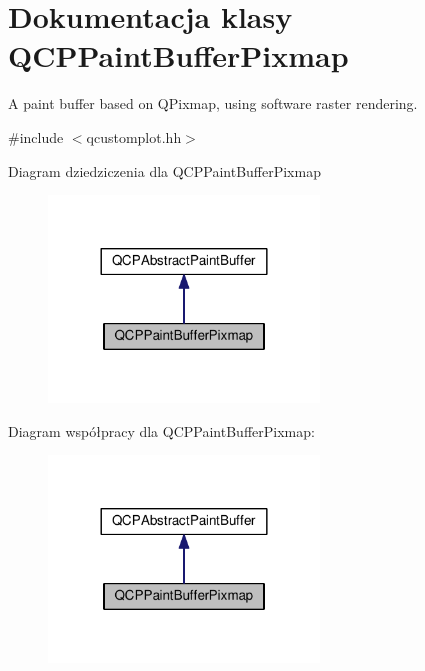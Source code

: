 \hypertarget{class_q_c_p_paint_buffer_pixmap}{}\section{Dokumentacja klasy Q\+C\+P\+Paint\+Buffer\+Pixmap}
\label{class_q_c_p_paint_buffer_pixmap}


A paint buffer based on Q\+Pixmap, using software raster rendering.  




{\ttfamily \#include $<$qcustomplot.\+hh$>$}



Diagram dziedziczenia dla Q\+C\+P\+Paint\+Buffer\+Pixmap\nopagebreak
\begin{figure}[H]
\begin{center}
\leavevmode
\includegraphics[width=204pt]{class_q_c_p_paint_buffer_pixmap__inherit__graph}
\end{center}
\end{figure}


Diagram współpracy dla Q\+C\+P\+Paint\+Buffer\+Pixmap\+:\nopagebreak
\begin{figure}[H]
\begin{center}
\leavevmode
\includegraphics[width=204pt]{class_q_c_p_paint_buffer_pixmap__coll__graph}
\end{center}
\end{figure}

